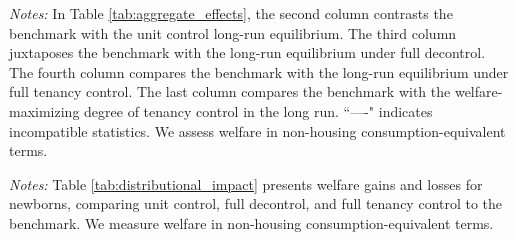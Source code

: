 \documentclass[parskip=full]{article}
\newenvironment{fignote2}[1]
{
\par
\medskip
\begin{minipage}{#1}
\footnotesize
}
{
\end{minipage}
}
\begin{document}
\begin{table}[H]
    \centering
    \caption{Aggregate effects generated by changes in rent control policy}
    \vspace{-0.5cm}
    \label{tab:aggregate_effects}
    
    \vspace{-0.45cm}
    \begin{fignote2}{1.02\textwidth}
      \textit{Notes:} In Table \ref{tab:aggregate_effects}, the second column contrasts the benchmark with the unit control long-run equilibrium. The third column juxtaposes the benchmark with the long-run equilibrium under full decontrol. The fourth column compares the benchmark with the long-run equilibrium under full tenancy control. The last column compares the benchmark with the welfare-maximizing degree of tenancy control in the long run. ``—-" indicates incompatible statistics. We assess welfare in non-housing consumption-equivalent terms.
    \end{fignote2}
\end{table}

\begin{table}[H]
    \centering
    \caption{Distributional impacts of rent control policy changes on newborns' welfare, broken down by income quintile ($\%\Delta$ in welfare)}
    \vspace{-0.5cm}
    \label{tab:distributional_impact}
    
    \vspace{-0.45cm}
    \begin{fignote2}{0.77\textwidth}
      \textit{Notes:} Table \ref{tab:distributional_impact} presents welfare gains and losses for newborns, comparing unit control, full decontrol, and full tenancy control to the benchmark. We measure welfare in non-housing consumption-equivalent terms.
    \end{fignote2}
\end{table}
\end{document}
